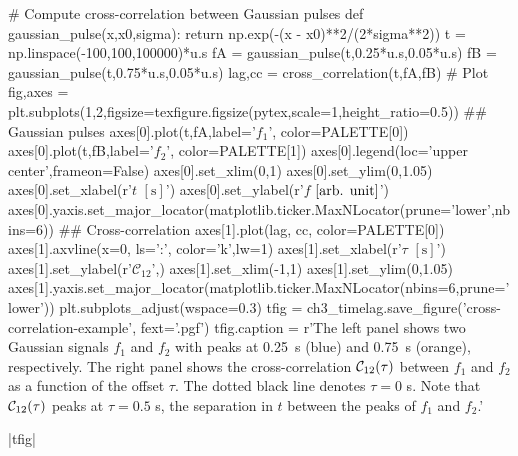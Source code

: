 \begin{pycode}
# Compute cross-correlation between Gaussian pulses
def gaussian_pulse(x,x0,sigma):
    return np.exp(-(x - x0)**2/(2*sigma**2))
t = np.linspace(-100,100,100000)*u.s
fA = gaussian_pulse(t,0.25*u.s,0.05*u.s)
fB = gaussian_pulse(t,0.75*u.s,0.05*u.s)
lag,cc = cross_correlation(t,fA,fB)
# Plot
fig,axes = plt.subplots(1,2,figsize=texfigure.figsize(pytex,scale=1,height_ratio=0.5))
## Gaussian pulses
axes[0].plot(t,fA,label='$f_1$', color=PALETTE[0])
axes[0].plot(t,fB,label='$f_2$', color=PALETTE[1])
axes[0].legend(loc='upper center',frameon=False)
axes[0].set_xlim(0,1)
axes[0].set_ylim(0,1.05)
axes[0].set_xlabel(r'$t$ $[\si{\second}]$')
axes[0].set_ylabel(r'$f$ $[\textup{arb. unit}]$')
axes[0].yaxis.set_major_locator(matplotlib.ticker.MaxNLocator(prune='lower',nbins=6))
## Cross-correlation
axes[1].plot(lag, cc, color=PALETTE[0])
axes[1].axvline(x=0, ls=':', color='k',lw=1)
axes[1].set_xlabel(r'$\tau$ $[\si{\second}]$')
axes[1].set_ylabel(r'$\mathcal{C}_{12}$',)
axes[1].set_xlim(-1,1)
axes[1].set_ylim(0,1.05)
axes[1].yaxis.set_major_locator(matplotlib.ticker.MaxNLocator(nbins=6,prune='lower'))
plt.subplots_adjust(wspace=0.3)
tfig = ch3_timelag.save_figure('cross-correlation-example', fext='.pgf')
tfig.caption = r'The left panel shows two Gaussian signals $f_1$ and $f_2$ with peaks at \SI{0.25}{\second} (blue) and \SI{0.75}{\second} (orange), respectively. The right panel shows the cross-correlation $\crosscor[12]$ between $f_1$ and $f_2$ as a function of the offset $\tau$. The dotted black line denotes $\tau=0$ \si{\second}. Note that $\crosscor[12]$ peaks at $\tau=0.5$ \si{\second}, the separation in $t$ between the peaks of $f_1$ and $f_2$.'
\end{pycode}
|tfig|

